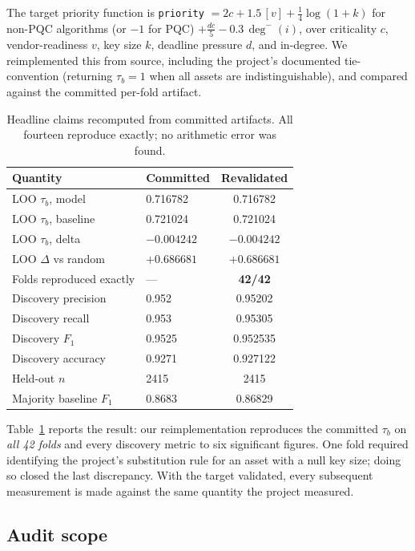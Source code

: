 \documentclass[conference]{IEEEtran}
\newcommand{\code}[1]{\texttt{\small #1}}
\begin{document}
The target priority function is \code{priority} $= 2c + 1.5\,[v] +
\frac{1}{4}\log(1+k)$ for non-PQC algorithms (or $-1$ for PQC) $+\frac{dc}{5} - 0.3\,\deg^{-}(i)$,
over criticality $c$, vendor-readiness $v$, key size $k$, deadline pressure $d$, and
in-degree. We reimplemented this from source, including the project's documented
tie-convention (returning $\tau_b=1$ when all assets are indistinguishable), and compared
against the committed per-fold artifact.

\begin{table}[t]
\centering
\caption{Headline claims recomputed from committed artifacts. All fourteen reproduce
exactly; no arithmetic error was found.}
\label{tab:headline}
\begin{tabular}{@{}llc@{}}
\toprule
\textbf{Quantity} & \textbf{Committed} & \textbf{Revalidated} \\
\midrule
LOO $\tau_b$, model & 0.716782 & 0.716782 \\
LOO $\tau_b$, baseline & 0.721024 & 0.721024 \\
LOO $\tau_b$, delta & $-0.004242$ & $-0.004242$ \\
LOO $\Delta$ vs random & $+0.686681$ & $+0.686681$ \\
Folds reproduced exactly & --- & \textbf{42/42} \\
Discovery precision & 0.952 & 0.95202 \\
Discovery recall & 0.953 & 0.95305 \\
Discovery $F_1$ & 0.9525 & 0.952535 \\
Discovery accuracy & 0.9271 & 0.927122 \\
Held-out $n$ & 2415 & 2415 \\
Majority baseline $F_1$ & 0.8683 & 0.86829 \\
\bottomrule
\end{tabular}
\end{table}

Table~\ref{tab:headline} reports the result: our reimplementation reproduces the
committed $\tau_b$ on \emph{all 42 folds} and every discovery metric to six significant
figures. One fold required identifying the project's substitution rule for an asset with a
null key size; doing so closed the last discrepancy. With the target validated, every
subsequent measurement is made against the same quantity the project measured.

\subsection{Audit scope}
\end{document}
